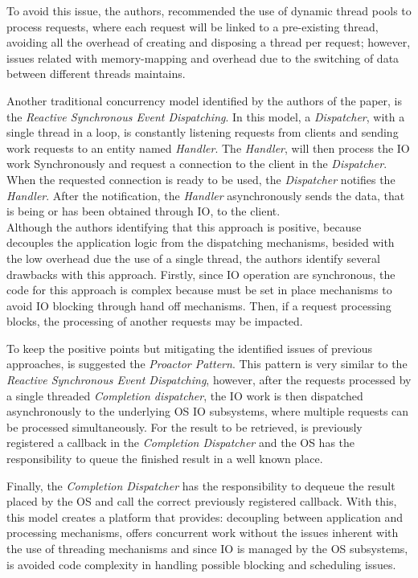 To avoid this issue, the authors, recommended the use of dynamic thread pools to process requests, where each request will be linked to a pre-existing thread, avoiding all the overhead of creating and disposing a thread per request;
however, issues related with memory-mapping and overhead due to the switching of data between different threads maintains. 

Another traditional concurrency model identified by the authors of the paper, is the \textit{Reactive Synchronous Event Dispatching}. In this model, a \textit{Dispatcher}, with a single thread in a loop, is constantly listening requests from clients and sending work requests to an entity named \textit{Handler}. 
The \textit{Handler}, will then process the IO work Synchronously and request a connection to the client in the \textit{Dispatcher}. When the requested connection is ready to be used, the \textit{Dispatcher} notifies the \textit{Handler}. After the notification, the \textit{Handler} asynchronously sends the data, that is being or has been obtained through IO, to the client.\\
Although the authors identifying that this approach is positive, because decouples the application logic from the dispatching mechanisms, besided with the low overhead due the use of a single thread, the authors identify several drawbacks with this approach. 
Firstly, since IO operation are synchronous, the code for this approach is complex because must be set in place mechanisms to avoid IO blocking through hand off mechanisms. 
Then, if a request processing blocks, the processing of another requests may be impacted. 

To keep the positive points but mitigating the identified issues of previous approaches, is suggested the \textit{Proactor Pattern}. 
This pattern is very similar to the \textit{Reactive Synchronous Event Dispatching}, however, after the requests processed by a single threaded \textit{Completion dispatcher}, 
the IO work is then dispatched asynchronously to the underlying OS IO subsystems, where multiple requests can be processed simultaneously. 
For the result to be retrieved, is previously registered a callback in the \textit{Completion Dispatcher} and the OS has the responsibility to queue the finished result in a well known place. 

Finally, the \textit{Completion Dispatcher} has the responsibility to dequeue the result placed by the OS and call the correct previously registered callback. 
With this, this model creates a platform that provides: decoupling between application and processing mechanisms,
offers concurrent work without the issues inherent with the use of threading mechanisms and since IO is managed by the OS subsystems, is avoided code complexity in handling possible blocking and scheduling issues.  

